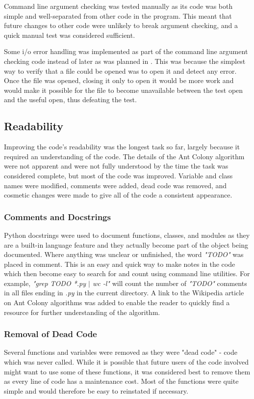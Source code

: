 \documentclass[11pt, oneside]{article}   %
\begin{document}
Command line argument checking was tested manually as its code was both simple and well-separated from other code in the program.
This meant that future changes to other code were unlikely to break argument checking, and a quick manual test was considered sufficient.

Some i/o error handling was implemented as part of the command line argument checking code instead of later as was planned in \cite{ref:Part-I}.
This was because the simplest way to verify that a file could be opened was to open it and detect any error.
Once the file was opened, closing it only to open it would be more work and would make it possible for the file to become unavailable between the test open and the useful open, thus defeating the test.

\subsection{Readability}
Improving the code’s readability was the longest task so far, largely because it required an understanding of the code.
The details of the Ant Colony algorithm were not apparent and were not fully understood by the time the task was considered complete, but most of the code was improved.
Variable and class names were modified, comments were added, dead code was removed, and cosmetic changes were made to give all of the code a consistent appearance.

\subsubsection{Comments and Docstrings}
Python docstrings were used to document functions, classes, and modules as they are a built-in language feature and they actually become part of the object being documented.
Where anything was unclear or unfinished, the word {\em "TODO"} was placed in comment.
This is an easy and quick way to make notes in the code which then become easy to search for and count using command line utilities.  
For example, {\em "grep TODO *.py $|$ wc -l"} will count the number of {\em "TODO"} comments in all files ending in {\em .py} in the current directory.
A link to the Wikipedia article on Ant Colony algorithms was added to enable the reader to quickly find a resource for further understanding of the algorithm.

\subsubsection{Removal of Dead Code}
Several functions and variables were removed as they were "dead code" - code which was never called.
While it is possible that future users of the code involved might want to use some of these functions, it was considered best to remove them as every line of code has a maintenance cost.
Most of the functions were quite simple and would therefore be easy to reinstated if necessary.  
\end{document}

